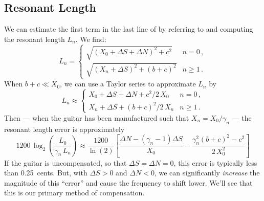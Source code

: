  \subsection{Resonant Length}
We can estimate the first term in the last line of  by referring to  and computing the resonant length $L_n$. We find:
 \begin{equation}  \label{eqn:l_n_def}
L_n = \begin{cases}
\sqrt{\left(X_0 + \Delta S + \Delta N\right)^2 + c^2} & n =  0\, , \\
\sqrt{\left(X_n + \Delta S\right)^2 + (b + c)^2} & n \ge 1\, .
 \end{cases}
 \end{equation}
When $b + c \ll X_0$, we can use a Taylor series to approximate $L_n$ by
 \begin{equation} \label{eqn:l_n_approx}
L_n \approx \begin{cases}
X_0 + \Delta S + \Delta N + c^2/2\, X_0 & n =  0\, , \\
X_n + \Delta S + (b + c)^2/2\, X_n & n \ge 1\, .
 \end{cases}
 \end{equation}
Then --- when the guitar has been manufactured such that $X_n = X_0 / \gamma_n$ --- the resonant length error is approximately
  \begin{equation} \label{eqn:rle_approx}
  1200\, \log_2 \left( \frac{L_0}{\gamma_n\, L_n} \right) \approx \frac{1200}{\ln(2)} \left[ \frac{\Delta N - \left(\gamma_n - 1\right) \Delta S}{X_0} - \frac{\gamma_n^2 (b + c)^2 - c^2}{2\, X_0^2}\right]
  \end{equation}
If the guitar is uncompensated, so that $\Delta S = \Delta N = 0$, this error is typically less than 0.25~cents. But, with $\Delta S > 0$ and $\Delta N < 0$, we can significantly \emph{increase} the magnitude of this ``error'' and cause the frequency to shift lower. We'll see that this is our primary method of compensation.

